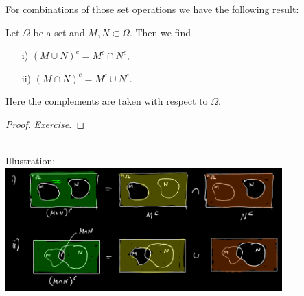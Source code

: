 \begin{frame}
For combinations of those set operations we have the following result: \vspace{-0.2cm}
 \begin{lemma}\label{lem:demorgan}
 	Let $\Omega$ be a set and $M,N \subset \Omega$. Then we find
 	\begin{itemize}
 		\item[i)] $ (M\cup N)^c  = M^c \cap N^c $,
 		\item[ii)] $ (M\cap N )^c =  M^c \cup  N^c $.
 	\end{itemize}
 Here the complements are taken with respect to $\Omega$.
 \end{lemma}\vspace{-0.5cm}
 \begin{proof}
 	\textit{Exercise.}
 \end{proof}
{
	\blank
	~\\
	Illustration:\\
	\includegraphics[width=0.8\textwidth]{./media/venn-diagram.png}
}
\end{frame}
 
